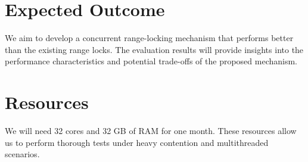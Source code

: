 \section{Expected Outcome}
We aim to develop a concurrent range-locking mechanism that performs better than the existing range locks. The evaluation results will provide insights into the performance characteristics and potential trade-offs of the proposed mechanism.

\section{Resources}
We will need 32 cores and 32 GB of RAM for one month. These resources allow us to perform thorough tests under heavy contention and multithreaded scenarios.